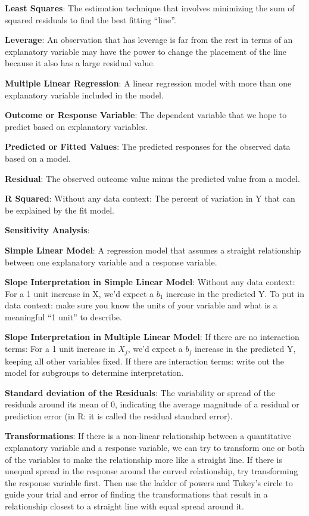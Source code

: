 \documentclass[
]{book}
\begin{document}
\textbf{Least Squares}: The estimation technique that involves minimizing the sum of squared residuals to find the best fitting ``line''.

\textbf{Leverage}: An observation that has leverage is far from the rest in terms of an explanatory variable may have the power to change the placement of the line because it also has a large residual value.

\textbf{Multiple Linear Regression}: A linear regression model with more than one explanatory variable included in the model.

\textbf{Outcome or Response Variable}: The dependent variable that we hope to predict based on explanatory variables.

\textbf{Predicted or Fitted Values}: The predicted responses for the observed data based on a model.

\textbf{Residual}: The observed outcome value minus the predicted value from a model.

\textbf{R Squared}: Without any data context: The percent of variation in Y that can be explained by the fit model.

\textbf{Sensitivity Analysis}:

\textbf{Simple Linear Model}: A regression model that assumes a straight relationship between one explanatory variable and a response variable.

\textbf{Slope Interpretation in Simple Linear Model}: Without any data context: For a 1 unit increase in X, we'd expect a \(b_1\) increase in the predicted Y. To put in data context: make sure you know the units of your variable and what is a meaningful ``1 unit'' to describe.

\textbf{Slope Interpretation in Multiple Linear Model}: If there are no interaction terms: For a 1 unit increase in \(X_j\), we'd expect a \(b_j\) increase in the predicted Y, keeping all other variables fixed. If there are interaction terms: write out the model for subgroups to determine interpretation.

\textbf{Standard deviation of the Residuals}: The variability or spread of the residuals around its mean of 0, indicating the average magnitude of a residual or prediction error (in R: it is called the residual standard error).

\textbf{Transformations}: If there is a non-linear relationship between a quantitative explanatory variable and a response variable, we can try to transform one or both of the variables to make the relationship more like a straight line. If there is unequal spread in the response around the curved relationship, try transforming the response variable first. Then use the ladder of powers and Tukey's circle to guide your trial and error of finding the transformations that result in a relationship closest to a straight line with equal spread around it.
\end{document}
